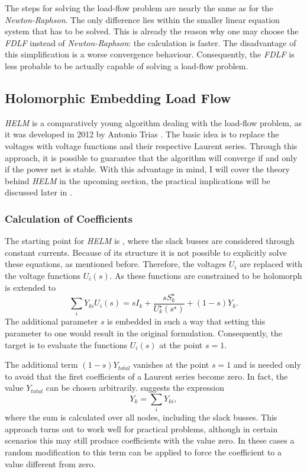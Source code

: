 The steps for solving the load-flow problem are nearly the same as for the \emph{Newton-Raphson}. The only difference lies within the smaller linear equation system that has to be solved. This is already the reason why one may choose the \emph{FDLF} instead of \emph{Newton-Raphson}: the calculation is faster. The disadvantage of this simplification is a worse convergence behaviour. Consequently, the \emph{FDLF} is less probable to be actually capable of solving a load-flow problem.

\subsection{Holomorphic Embedding Load Flow}
\label{sec:helm}

\emph{HELM} is a comparatively young algorithm dealing with the load-flow problem, as it was developed in 2012 by Antonio Trias \citep{helmIEEE}. The basic idea is to replace the voltages with voltage functions and their respective Laurent series. Through this approach, it is possible to guarantee that the algorithm will converge if and only if the power net is stable. With this advantage in mind, I will cover the theory behind  \emph{HELM} in the upcoming section, the practical implications will be discussed later in .

\subsubsection{Calculation of Coefficients}

The starting point for \emph{HELM} is , where the slack busses are considered through constant currents. Because of its structure it is not possible to explicitly solve these equations, as mentioned before. Therefore, the voltages $U_i$ are replaced with the voltage functions $U_i(s)$. As these functions are constrained to be holomorph \citep{helmPatentSept2009}  is extended to
\begin{equation}	
		\sum_i Y_{ki} U_{i}(s) = s I_k + \frac{s S_k^\star}{U_k^\star(s^\star)} + (1 - s) Y_k.
		\label{eq:pq_bus_embedded}
\end{equation}
The additional parameter $s$ is embedded in such a way that setting this parameter to one would result in the original formulation. Consequently, the target is to evaluate the functions $U_i(s)$ at the point $s = 1$.

The additional term $(1 - s) Y_{total}$ vanishes at the point $s = 1$ and is needed only to avoid that the first coefficients of a Laurent series become zero. In fact, the value $Y_{total}$ can be chosen arbitrarily. \citep{helmPatentSept2009} suggests the expression
\begin{equation}
	Y_k = \sum_i Y_{ki},
\end{equation}
where the sum is calculated over all nodes, including the slack busses. This approach turns out to work well for practical problems, although in certain scenarios this may still produce coefficients with the value zero. In these cases a random modification to this term can be applied to force the coefficient to a value different from zero.

